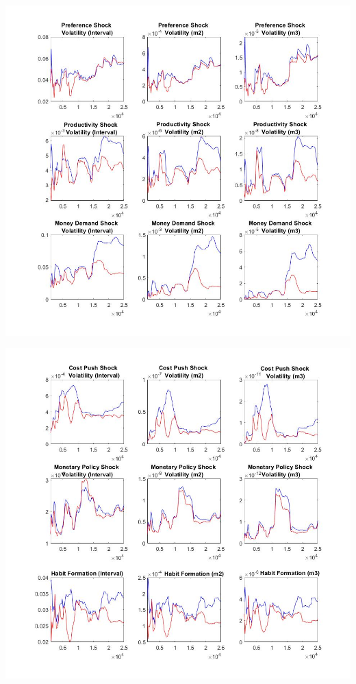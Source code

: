 \documentclass[11pt,preprint, authoryear]{elsarticle}
\let\origfigure\figure
\let\endorigfigure\endfigure
\renewenvironment{figure}[1][2] {
    \expandafter\origfigure\expandafter[H]
} {
    \endorigfigure
}
\numberwithin{equation}{section}
\numberwithin{figure}{section}
\numberwithin{table}{section}
\begin{document}
\begin{figure}
    \centering 
    \begin{minipage}[t]{8.2cm} 
        \centering 
        \includegraphics[width=\linewidth]{mctay1.jpg} 
    \end{minipage} 
    \hspace{0.1cm} 
    \begin{minipage}[t]{8.2cm} 
        \centering 
        \includegraphics[width=\linewidth]{mctay2.jpg} 
    \end{minipage}
    \caption{(a) MCMC - Taylor Rule}
    \label{mctay12}
\end{figure}
\end{document}
